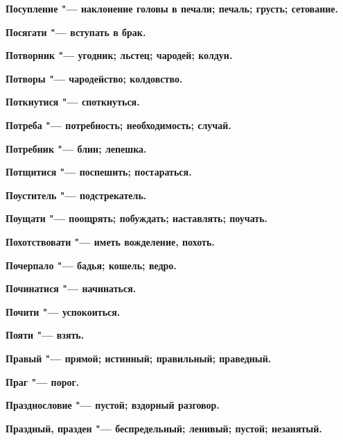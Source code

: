 \begin{multicols}{2}
\bfseries Посупление\normalfont{} "--- наклонение головы в печали; печаль; грусть; сетование. 




\bfseries Посягати\normalfont{} "--- вступать в брак. 




\bfseries Потворник\normalfont{} "--- угодник; льстец; чародей; колдун. 




\bfseries Потворы\normalfont{} "--- чародейство; колдовство. 




\bfseries Поткнутися\normalfont{} "--- споткнуться. 




\bfseries Потреба\normalfont{} "--- потребность; необходимость; случай. 




\bfseries Потребник\normalfont{} "--- блин; лепешка. 




\bfseries Потщитися\normalfont{} "--- поспешить; постараться. 




\bfseries Поуститель\normalfont{} "--- подстрекатель. 




\bfseries Поущати\normalfont{} "--- поощрять; побуждать; наставлять; поучать. 




\bfseries Похотствовати\normalfont{} "--- иметь вожделение, похоть. 




\bfseries Почерпало\normalfont{} "--- бадья; кошель; ведро. 




\bfseries Починатися\normalfont{} "--- начинаться. 




\bfseries Почити\normalfont{} "--- успокоиться. 




\bfseries Пояти\normalfont{} "--- взять. 




\bfseries Правый\normalfont{} "--- прямой; истинный; правильный; праведный. 




\bfseries Праг\normalfont{} "--- порог. 

\bfseries Празднословие\normalfont{} "--- пустой; вздорный разговор. 



\bfseries Праздный, празден\normalfont{} "--- беспредельный; ленивый; пустой; незанятый. 





\end{multicols}
